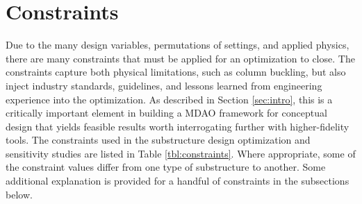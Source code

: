 \section{Constraints}
Due to the many design variables, permutations of settings, and applied
physics, there are many constraints that must be applied for an
optimization to close.  The constraints capture both physical
limitations, such as column buckling, but also inject industry
standards, guidelines, and lessons learned from engineering experience
into the optimization.  As described in Section \ref{sec:intro}, this is
a critically important element in building a MDAO framework for
conceptual design that yields feasible results worth interrogating
further with higher-fidelity tools.  The constraints used in the
substructure design optimization and sensitivity studies are listed in
Table \ref{tbl:constraints}.  Where appropriate, some of the constraint
values differ from one type of substructure to another.  Some additional
explanation is provided for a handful of constraints in the subsections
below.


